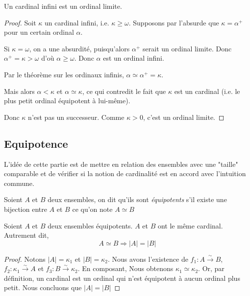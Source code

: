 \begin{proposition}
    Un cardinal infini est un ordinal limite.
\end{proposition}

\begin{proof}
Soit $\kappa$ un cardinal infini, i.e. $\kappa \geq \omega$. Supposons par l'absurde que $\kappa = \alpha^+$ pour un certain ordinal $\alpha$.

Si $\kappa = \omega$, on a une absurdité, puisqu'alors $\alpha^+$ serait un ordinal limite. Donc $\alpha^+=\kappa>\omega$ d'où $\alpha\ge\omega$. Donc $\alpha$ est un ordinal infini.

Par le théorème sur les ordinaux infinis, $\alpha \simeq \alpha^+ = \kappa$.

Mais alors $\alpha < \kappa$ et $\alpha \simeq \kappa$, ce qui contredit le fait que $\kappa$ est un cardinal (i.e. le plus petit ordinal équipotent à lui-même).

Donc $\kappa$ n'est pas un successeur. Comme $\kappa > 0$, c'est un ordinal limite.
\end{proof}

\subsection{Equipotence}

L'idée de cette partie est de mettre en relation des ensembles avec une "taille" comparable et de vérifier si la notion de cardinalité est en accord avec l'intuition commune.

\begin{definition}
    Soient $A$ et $B$ deux ensembles, on dit qu'ils sont \emph{équipotents} s'il existe une bijection entre $A$ et $B$ ce qu'on note $A\simeq B$
\end{definition}

\begin{lemme}
    Soient $A$ et $B$ deux ensembles équipotents. $A$ et $B$ ont le même cardinal. Autrement dit,
    \[
    A\simeq B \Rightarrow |A|= |B|
    \]
\end{lemme}

\begin{proof}
    Notons $|A|=\kappa_1$ et $|B|= \kappa_2$. Nous avons l'existence de $f_1: A\overset{\sim}{\to} B$, $f_2: \kappa_1\overset{\sim}{\to}A$ et $f_3: B\overset{\sim}{\to}\kappa_2$. En composant, Nous obtenons $\kappa_1 \simeq \kappa_2$. Or, par définition, un cardinal est un ordinal qui n'est équipotent à aucun ordinal plus petit. Nous concluons que $|A|= |B|$ 
\end{proof}


